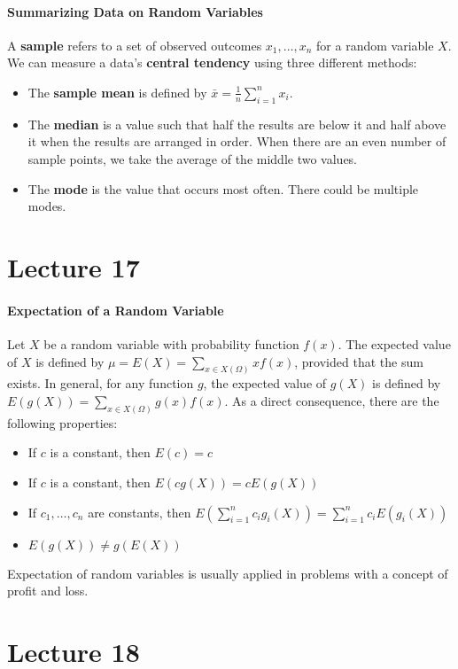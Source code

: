 \documentclass[10pt,letter]{article}
\begin{document}
\paragraph{Summarizing Data on Random Variables}
A \textbf{sample} refers to a set of observed outcomes $x_1,\ldots,x_n$ for a random variable $X$. \\ 
We can measure a data's \textbf{central tendency} using three different methods: 
\begin{itemize}
    \item The \textbf{sample mean} is defined by $\bar{x}=\frac{1}{n}\sum_{i=1}^nx_i$. 
    \item The \textbf{median} is a value such that half the results are below it and half above it when the results are arranged in order. When there are an even number of sample points, we take the average of the middle two values. 
    \item The \textbf{mode} is the value that occurs most often. There could be multiple modes. 
\end{itemize}

\section*{Lecture 17}
\paragraph{Expectation of a Random Variable}
Let $X$ be a random variable with probability function $f(x)$. The expected value of $X$ is defined by $\mu=E(X)=\sum_{x\in X(\Omega)}xf(x)$, provided that the sum exists. In general, for any function $g$, the expected value of $g(X)$ is defined by $E(g(X))=\sum_{x\in X(\Omega)}g(x)f(x)$. As a direct consequence, there are the following properties: \begin{itemize}
    \item If $c$ is a constant, then $E(c)=c$ 
    \item If $c$ is a constant, then $E(cg(X))=cE(g(X))$ 
    \item If $c_1,\ldots,c_n$ are constants, then $E\left(\sum_{i=1}^nc_ig_i(X)\right)=\sum_{i=1}^nc_iE(g_i(X))$ 
    \item $E(g(X))\neq g(E(X))$
\end{itemize}
Expectation of random variables is usually applied in problems with a concept of profit and loss.

\section*{Lecture 18}
\end{document}
